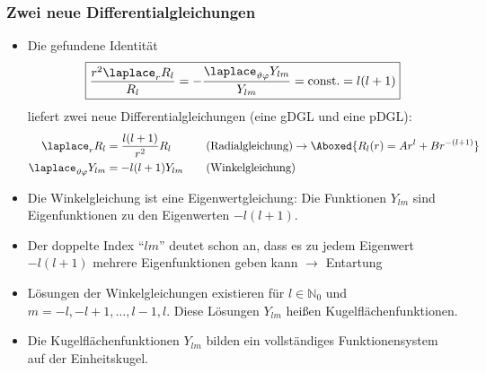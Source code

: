     \begin{frame}
      \frametitle{Zwei neue Differentialgleichungen}
      \begin{itemize}[<+->]
        \item Die gefundene Identität
      $$
      \boxed{\frac{r^2\laplace_rR_l}{R_l} = - \frac{\laplace_{\vartheta\varphi} Y_{lm}}{Y_{lm}} = \text{const.} = l(l+1)}
      $$
      liefert zwei neue Differentialgleichungen (eine gDGL und eine pDGL):
      \begin{align*}
      \laplace_r R_l & = \frac{l(l+1)}{r^2} R_l &\quad & \text{(Radialgleichung)} \to \Aboxed{R_l(r) = A r^l+ Br^{-(l+1)}}\\
      \laplace_{\vartheta\varphi} Y_{lm} & = - l(l+1) Y_{lm} &\quad & \text{(Winkelgleichung)}
      \end{align*}
    \item Die \alert{Winkelgleichung} ist eine \alert{Eigenwertgleichung}: Die Funktionen $Y_{lm}$ sind Eigenfunktionen zu den Eigenwerten $-l(l+1)$.
    \item Der doppelte Index \enquote{$lm$} deutet schon an, dass es zu jedem Eigenwert $-l(l+1)$ \alert{mehrere Eigenfunktionen} geben kann $\to$ \alert{Entartung}
    \item Lösungen der Winkelgleichungen existieren für $l \in \mathbb{N}_0$ und $m = -l, -l+1, \dots, l-1, l$. Diese Lösungen $Y_{lm}$ heißen \alert{Kugelflächenfunktionen}.
      \item Die Kugelflächenfunktionen $Y_{lm}$ bilden ein \alert{vollständiges Funktionensystem auf der Einheitskugel}.
        \end{itemize}
      \end{frame}

